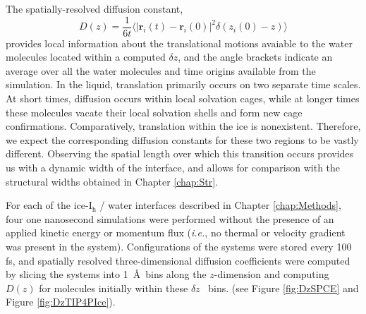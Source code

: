 The spatially-resolved diffusion constant,
\begin{equation}\label{eq:diffusion3}
D(z) = \frac{1}{6t} \langle | \mathbf{r}_i(t) - \mathbf{r}_i(0) |^2
\delta(z_i(0) - z)  \rangle 
\end{equation}
provides local information about the translational motions avaiable to
the water molecules located within a computed $\delta z$, and the
angle brackets indicate an average over all the water molecules and
time origins available from the simulation. In the liquid, translation
primarily occurs on two separate time scales. At short times,
diffusion occurs within local solvation cages, while at longer times
these molecules vacate their local solvation shells and form new cage
confirmations. Comparatively, translation within the ice is
nonexistent. Therefore, we expect the corresponding diffusion
constants for these two regions to be vastly different. Observing the
spatial length over which this transition occurs provides us with a
dynamic width of the interface, and allows for comparison with the
structural widths obtained in Chapter \ref{chap:Str}.

For each of the ice-I$_\mathrm{h}$ / water interfaces described in
Chapter \ref{chap:Methods}, four one nanosecond simulations were
performed without the presence of an applied kinetic energy or
momentum flux (\textit{i.e.}, no thermal or velocity gradient was
present in the system). Configurations of the systems were stored
every 100 fs, and spatially resolved three-dimensional diffusion
coefficients were computed by slicing the systems into 1~\AA~bins
along the $z$-dimension and computing $D(z)$ for molecules initially
within these $\delta z$~ bins. (see Figure \ref{fig:DzSPCE} and Figure
\ref{fig:DzTIP4PIce}).


